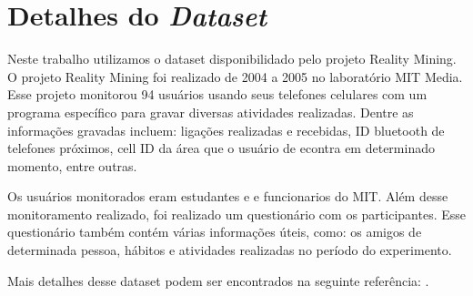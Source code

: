 \section{Detalhes do \textit{Dataset}}\label{modelagem}

Neste trabalho utilizamos o dataset disponibilidado pelo projeto Reality
Mining. O projeto Reality Mining foi realizado de 2004 a 2005 no
laboratório MIT Media. Esse projeto monitorou 94 usuários usando seus
telefones celulares com um programa específico para gravar diversas
atividades realizadas. Dentre as informações gravadas incluem: ligações
realizadas e recebidas, ID bluetooth de telefones próximos, cell ID da
área que o usuário de econtra em determinado momento, entre outras.

Os usuários monitorados eram estudantes e e funcionarios do MIT. Além
desse monitoramento realizado, foi realizado um questionário com os
participantes. Esse questionário também contém várias informações úteis,
como: os amigos de determinada pessoa, hábitos e atividades realizadas
no período do experimento. 

Mais detalhes desse dataset podem ser encontrados na seguinte
referência: \cite{eagle2007isn}.
